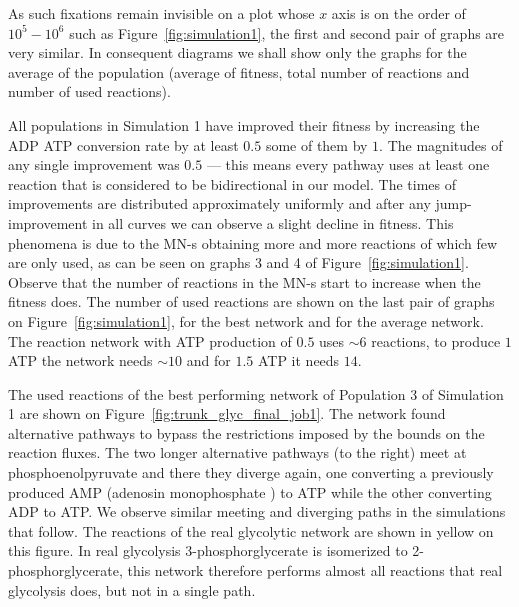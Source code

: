 \documentclass[a4paper,12pt]{article}
\begin{document}
As such fixations remain invisible on a plot whose $x$ axis is on the order of $10^5-10^6$ such as Figure~\ref{fig:simulation1}, the first and second pair of graphs are very similar. In consequent diagrams we shall show only the graphs for the average of the population (average of fitness, total number of reactions and number of used reactions).

All populations in Simulation 1 have improved their fitness by increasing the ADP ATP conversion rate by at least $0.5$ some of them by $1$. The magnitudes of any single improvement was $0.5$ --- this means every pathway uses at least one reaction that is considered to be bidirectional in our model. The times of improvements are distributed approximately uniformly and after any jump-improvement in all curves we can observe a slight decline in fitness. This phenomena is due to the MN-s obtaining more and more reactions of which few are only used, as can be seen on graphs 3 and 4 of Figure~\ref{fig:simulation1}. Observe that the number of reactions in the MN-s start to increase when the fitness does. The number of used reactions are shown on the last pair of graphs on Figure~\ref{fig:simulation1}, for the best network and for the average network. The reaction network with ATP production of $0.5$ uses $\sim 6$ reactions, to produce $1$ ATP the network needs $\sim 10$ and for $1.5$ ATP it needs $14$. 

The used reactions of the best performing network of Population 3 of Simulation 1 are shown on Figure~\ref{fig:trunk_glyc_final_job1}. The network found alternative pathways to bypass the restrictions imposed by the bounds on the reaction fluxes. The two longer alternative pathways (to the right) meet at phosphoenolpyruvate and there they diverge again, one converting a previously produced AMP (adenosin monophosphate ) to ATP while the other converting ADP to ATP. We observe similar meeting and diverging paths in the simulations that follow. The reactions of the real glycolytic network are shown in yellow on this figure. In real glycolysis 3-phosphorglycerate is isomerized to 2-phosphorglycerate, this network therefore performs almost all reactions that real glycolysis does, but not in a single path. 
\end{document}

